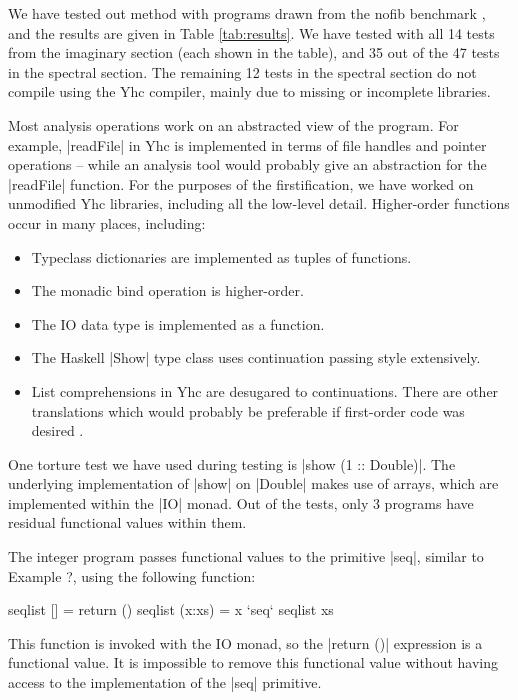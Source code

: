 \documentclass[preprint]{sigplanconf}
\begin{document}
We have tested out method with programs drawn from the nofib benchmark \cite{nofib}, and the results are given in Table \ref{tab:results}. We have tested with all 14 tests from the imaginary section (each shown in the table), and 35 out of the 47 tests in the spectral section. The remaining 12 tests in the spectral section do not compile using the Yhc compiler, mainly due to missing or incomplete libraries.

Most analysis operations work on an abstracted view of the program. For example, |readFile| in Yhc is implemented in terms of file handles and pointer operations -- while an analysis tool would probably give an abstraction for the |readFile| function. For the purposes of the firstification, we have worked on unmodified Yhc libraries, including all the low-level detail. Higher-order functions occur in many places, including:

\begin{itemize}
\item Typeclass dictionaries are implemented as tuples of functions.
\item The monadic bind operation is higher-order.
\item The IO data type is implemented as a function.
\item The Haskell |Show| type class uses continuation passing style extensively.
\item List comprehensions in Yhc are desugared to continuations. There are other translations which would probably be preferable if first-order code was desired \cite{list_comps,duncan_deforestation}.
\end{itemize}

One torture test we have used during testing is |show (1 :: Double)|. The underlying implementation of |show| on |Double| makes use of arrays, which are implemented within the |IO| monad. Out of the tests, only 3 programs have residual functional values within them.

The integer program passes functional values to the primitive |seq|, similar to Example ?, using the following function:

\begin{code}
seqlist [] = return ()
seqlist (x:xs) = x `seq` seqlist xs
\end{code}

This function is invoked with the IO monad, so the |return ()| expression is a functional value. It is impossible to remove this functional value without having access to the implementation of the |seq| primitive.
\end{document}
